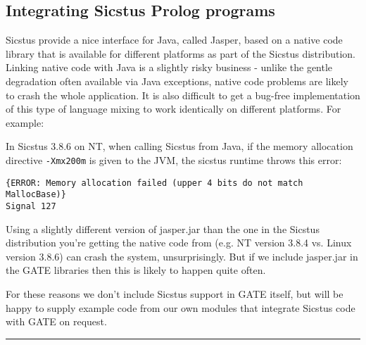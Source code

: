 
\subsection{Integrating Sicstus Prolog programs}


Sicstus provide a nice interface for Java, called Jasper, based on a native
code library that is available for different platforms as part of the
Sicstus distribution.  Linking native code with Java is a slightly risky
business - unlike the gentle degradation often available via Java
exceptions, native code problems are likely to crash the whole application. 
It is also difficult to get a bug-free implementation of this type of
language mixing to work identically on different platforms. For example:

In Sicstus 3.8.6 on NT,
when calling Sicstus from Java, if the memory allocation directive
{\tt -Xmx200m} is given to the JVM, the sicstus runtime throws
this error:
\begin{verbatim} 
{ERROR: Memory allocation failed (upper 4 bits do not match MallocBase)}
Signal 127
\end{verbatim}

Using a slightly different version of jasper.jar than the one in the 
Sicstus distribution you're getting the native code from
(e.g. NT version 3.8.4 vs. Linux version 3.8.6) can crash the
system, unsurprisingly. But if we include jasper.jar in the GATE libraries
then this is likely to happen quite often.

For these reasons we don't include Sicstus support in GATE itself, but will
be happy to supply example code from our own modules that integrate Sicstus
code with GATE on request.
\vspace{1mm}\hrule 

